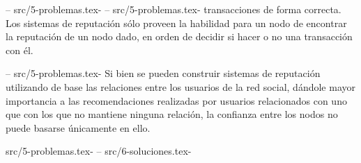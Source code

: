                         
                        
                        
--
src/5-problemas.tex-%
--
src/5-problemas.tex-    transacciones de forma correcta. Los sistemas de reputación sólo proveen la
                        habilidad para un nodo de encontrar la reputación de un nodo dado, en orden de
                        decidir si hacer o no una transacción con él.
                        
--
src/5-problemas.tex-     Si bien se pueden construir sistemas de reputación utilizando de base las
                        relaciones entre los usuarios de la red social, dándole
                        mayor importancia a las recomendaciones realizadas por usuarios relacionados
                        con uno que con los que no mantiene ninguna relación, la confianza entre los
                        nodos no puede basarse únicamente en ello. %
                        
src/5-problemas.tex-    
--
src/6-soluciones.tex-
                     
